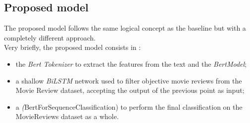 \subsection{Proposed model}
The proposed model follows the same logical concept as the baseline but with a completely different approach.\\
Very briefly, the proposed model consists in :
\begin{itemize}
    \item the \textit{Bert Tokenizer}\cite{tokenizer} to extract the features from the text and the \textit{BertModel}\cite{model};
    \item a shallow \textit{BiLSTM} network used to filter objective movie reviews from the Movie Review dataset, accepting the output of the previous point as input;
    \item a \textit(BertForSequenceClassification) to perform the final classification on the MovieReviews dataset as a whole.
\end{itemize}

